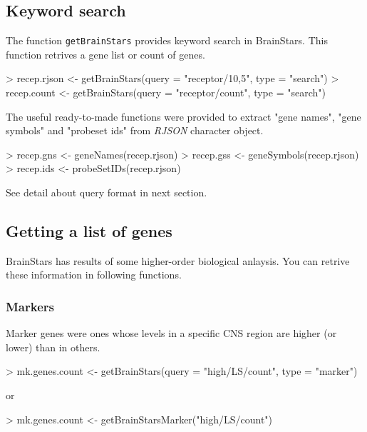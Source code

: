 \documentclass[12pt,fullpage]{article}
\newcommand{\Rfunction}[1]{{\texttt{#1}}}
\newcommand{\Rpackage}[1]{{\textit{#1}}}
\begin{document}
\subsection{Keyword search}
The function \Rfunction{getBrainStars} provides keyword search in BrainStars. This function retrives a gene list or count of genes.
\begin{Schunk}
\begin{Sinput}
> recep.rjson <- getBrainStars(query = "receptor/10,5",  type = "search")
> recep.count <- getBrainStars(query = "receptor/count", type = "search")
\end{Sinput}
\end{Schunk}
The useful ready-to-made functions were provided to extract "gene names", "gene symbols" and "probeset ids" from \Rpackage{RJSON} character object.
\begin{Schunk}
\begin{Sinput}
> recep.gns <- geneNames(recep.rjson)
> recep.gss <- geneSymbols(recep.rjson)
> recep.ids <- probeSetIDs(recep.rjson)
\end{Sinput}
\end{Schunk}
See detail about query format in next section.

\subsection{Getting a list of genes}
BrainStars has results of some higher-order biological anlaysis. You can retrive these information in following functions.

\subsubsection{Markers}
Marker genes were ones whose levels in a specific CNS region are higher (or lower) than in others.
\begin{Schunk}
\begin{Sinput}
> mk.genes.count <- getBrainStars(query = "high/LS/count", type = "marker")
\end{Sinput}
\end{Schunk}
or
\begin{Schunk}
\begin{Sinput}
> mk.genes.count <- getBrainStarsMarker("high/LS/count")
\end{Sinput}
\end{Schunk}
\end{document}
